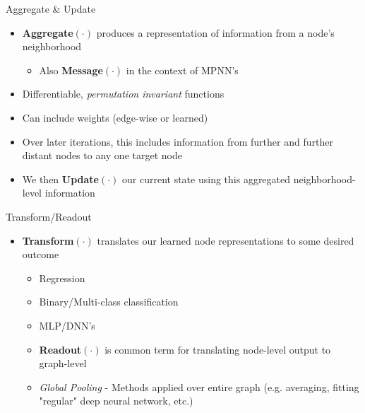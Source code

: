 \documentclass{beamer}
\begin{document}
\begin{frame}{Aggregate \& Update}
    \begin{itemize}
        \item {\bf Aggregate$(\cdot)$} produces a representation of information from a node's neighborhood 
        \begin{itemize}
            \item Also {\bf Message$(\cdot)$} in the context of MPNN's \cite{gilmer_neural_2017}
        \end{itemize}
        \item Differentiable, {\it permutation invariant} functions 
        \item Can include weights (edge-wise or learned)
        \item Over later iterations, this includes information from further and further distant nodes to any one target node 
        \item We then {\bf Update$(\cdot)$} our current state using this aggregated neighborhood-level information
    \end{itemize}
\end{frame}


\begin{frame}{Transform/Readout}
    \begin{itemize}
        \item {\bf Transform$(\cdot)$ } translates our learned node representations to some desired outcome 
        \begin{itemize}
            \item Regression
            \item Binary/Multi-class classification 
            \item MLP/DNN's 
        \item {\bf Readout$(\cdot)$} is common term for translating node-level output to graph-level
            \item {\it Global Pooling} - Methods applied over entire graph (e.g. averaging, fitting "regular" deep neural network, etc.)
        \end{itemize}
    \end{itemize}
\end{frame}
\end{document}
